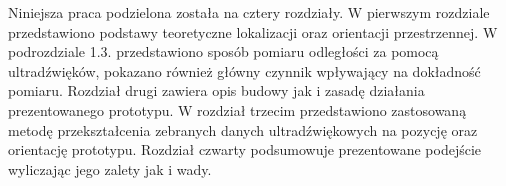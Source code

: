 Niniejsza praca podzielona została na cztery rozdziały. W pierwszym rozdziale przedstawiono podstawy teoretyczne lokalizacji oraz orientacji 
przestrzennej. W podrozdziale 1.3. przedstawiono sposób pomiaru odległości za pomocą ultradźwięków, pokazano 
również główny czynnik wpływający na dokładność pomiaru.
Rozdział drugi zawiera opis budowy jak i zasadę działania prezentowanego prototypu. W rozdział trzecim
przedstawiono zastosowaną metodę przekształcenia zebranych danych ultradźwiękowych na pozycję oraz orientację prototypu.
Rozdział czwarty podsumowuje prezentowane podejście wyliczając jego zalety jak i wady.

